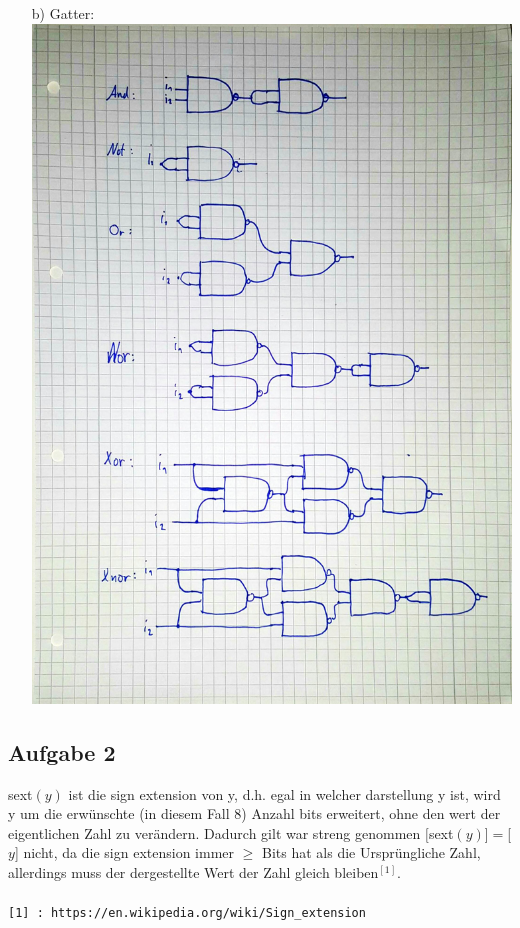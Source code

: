 \documentclass{scrartcl}
\begin{document}
\begin{itemize}
	\item[b)] Gatter: \\
    \includegraphics[width=14cm]{1b.jpg}



	\end{itemize}
	\subsection*{Aufgabe 2}
  sext\((y)\) ist die sign extension von y, d.h. egal in welcher darstellung y ist,
  wird y um die erwünschte (in diesem Fall 8) Anzahl bits erweitert, ohne den wert
  der eigentlichen Zahl zu verändern. Dadurch gilt war streng genommen
  $[$sext$(y)$]$ = $[$y$] nicht, da die sign extension immer $\geq$ Bits hat als die
  Ursprüngliche Zahl, allerdings muss der dergestellte Wert der Zahl gleich bleiben$^{[1]}$.
  \\ \\
  \verb![1] : https://en.wikipedia.org/wiki/Sign_extension!
\end{document}
